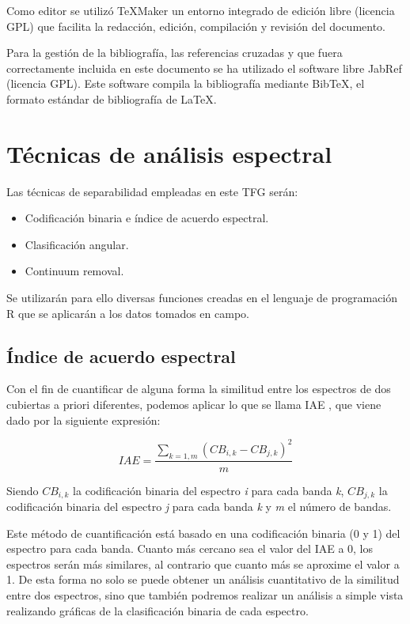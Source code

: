 Como editor se utilizó TeXMaker \citep{Brachet2003} un entorno integrado de edición libre (licencia GPL) que facilita la redacción, edición, compilación y revisión del documento.\Sep

Para la gestión de la bibliografía, las referencias cruzadas y que fuera correctamente incluida en este documento se ha utilizado el software libre JabRef (licencia GPL). Este software compila la bibliografía mediante BibTeX, el formato estándar de bibliografía de \LaTeX.

\section{Técnicas de análisis espectral}
\label{sec:tecnicas}

Las técnicas de separabilidad empleadas en este \ac{TFG} serán:
\begin{itemize}
	\item Codificación binaria e índice de acuerdo espectral.
	\item Clasificación angular.
	\item Continuum removal.
\end{itemize}

Se utilizarán para ello diversas funciones creadas en el lenguaje de programación R que se aplicarán a los datos tomados en campo.

\subsection{Índice de acuerdo espectral}
Con el fin de cuantificar de alguna forma la similitud entre los espectros de dos cubiertas a priori diferentes, podemos aplicar lo que se llama \ac{IAE} \citep{chuvieco2002teledeteccion}, que viene dado por la siguiente expresión:

\begin{equation} \label{eq:IAE}
	IAE = \frac{\sum_{k=1,m}(CB_{i,k} - CB_{j,k})^{2}}{m}
\end{equation}\Sep

Siendo $CB_{i,k}$ la codificación binaria del espectro \textit{i} para cada banda \textit{k}, $CB_{j,k}$ la codificación binaria del espectro \textit{j} para cada banda \textit{k} y \textit{m} el número de bandas.\Sep

Este método de cuantificación está basado en una codificación binaria (0 y 1) del espectro para cada banda. Cuanto más cercano sea el valor del \ac{IAE} a 0, los espectros serán más similares, al contrario que cuanto más se aproxime el valor a 1. De esta forma no solo se puede obtener un análisis cuantitativo de la similitud entre dos espectros, sino que también podremos realizar un análisis a simple vista realizando gráficas de la clasificación binaria de cada espectro.\Sep

